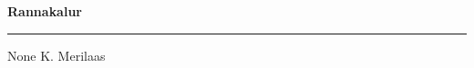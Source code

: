 \documentclass[10pt]{book}
\begin{document}
{
  \samepage
  \raggedbottom
  \raggedright
  \sloppy


  \vspace{0.2in}

  \noindent\begin{minipage}{.1\textwidth}
    \hfill\vspace{0.1in}
  \end{minipage}%
  \noindent\begin{minipage}{.8\textwidth}
    \centering
    \bfseries
    \large Rannakalur
  \end{minipage}%
  \noindent\begin{minipage}{.1\textwidth}
      \hfill\vspace{0.1in}
  \end{minipage}

  \nopagebreak[4]
  \vspace{0.1in}
  \nopagebreak[4]
  \hrule height 0.05ex
  \nopagebreak[4]
  \vspace{-0.05in}

  {\footnotesize None \hfill K. Merilaas }\\
  \vspace{0.01in}



}
\end{document}

